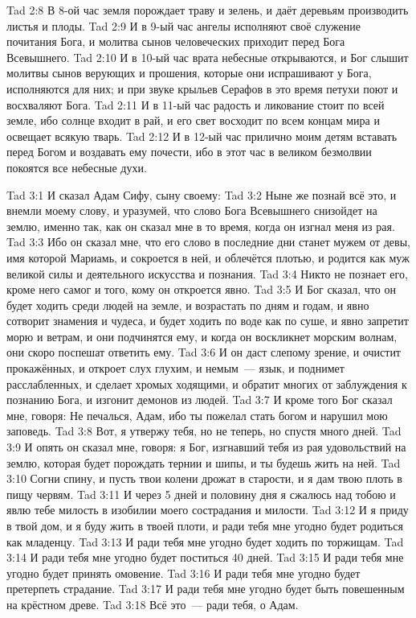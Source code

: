\vs Tad 2:8
В 8-ой час земля порождает траву и зелень,
и даёт деревьям производить листья и плоды.
\vs Tad 2:9
И в 9-ый час ангелы исполняют своё
служение почитания Бога,
и молитва сынов человеческих приходит перед Бога Всевышнего.
\vs Tad 2:10
И в 10-ый час врата небесные открываются,
и Бог слышит молитвы сынов верующих и прошения,
которые они испрашивают у Бога, исполняются для них;
и при звуке крыльев Серафов в это время
петухи поют и восхваляют Бога.
\vs Tad 2:11
И в 11-ый час радость и ликование стоит по всей земле,
ибо солнце входит в рай,
и его свет восходит по всем концам мира
и освещает всякую тварь.
\vs Tad 2:12
И в 12-ый час прилично моим детям вставать
перед Богом и воздавать ему почести,
ибо в этот час в великом безмолвии
покоятся все небесные духи.
 


\vs Tad 3:1
И сказал Адам Сифу, сыну своему:
\vs Tad 3:2
Ныне же познай всё это, и внемли моему слову,
и уразумей, что слово Бога Всевышнего снизойдет на землю,
именно так, как он сказал мне в то время,
когда он изгнал меня из рая.
\vs Tad 3:3
Ибо он сказал мне, что его слово в последние дни
станет мужем от девы, имя которой Мариамь,
и сокроется в ней, и облечётся плотью,
и родится как муж великой силы
и деятельного искусства и познания.
\vs Tad 3:4
Никто не познает его, кроме него самог и того,
кому он откроется явно.
\vs Tad 3:5
И Бог сказал, что он будет ходить среди людей на земле,
и возрастать по дням и годам,
и явно сотворит знамения и чудеса,
и будет ходить по воде как по суше,
и явно запретит морю и ветрам, и они подчинятся ему,
и когда он воскликнет морским волнам,
они скоро поспешат ответить ему.
\vs Tad 3:6
И он даст слепому зрение, и очистит прокажённых,
и откроет слух глухим, и немым~--- язык,
и поднимет расслабленных, и сделает хромых ходящими,
и обратит многих от заблуждения к познанию Бога,
и изгонит демонов из людей.
\vs Tad 3:7
И кроме того Бог сказал мне, говоря:
Не печалься, Адам, ибо ты пожелал стать богом
и нарушил мою заповедь.
\vs Tad 3:8
Вот, я утвержу тебя, но не теперь,
но спустя много дней.
\vs Tad 3:9
И опять он сказал мне, говоря:
я Бог, изгнавший тебя из рая удовольствий на землю,
которая будет порождать тернии и шипы,
и ты будешь жить на ней.
\vs Tad 3:10
Согни спину, и пусть твои колени дрожат в старости,
и я дам твою плоть в пищу червям.
\vs Tad 3:11
И через 5 дней и половину дня я сжалюсь над тобою
и явлю тебе милость в изобилии моего сострадания и милости.
\vs Tad 3:12
И я приду в твой дом, и я буду жить в твоей плоти,
и ради тебя мне угодно будет родиться как младенцу.
\vs Tad 3:13
И ради тебя мне угодно будет ходить по торжищам.
\vs Tad 3:14
И ради тебя мне угодно будет поститься 40 дней.
\vs Tad 3:15
И ради тебя мне угодно будет принять омовение.
\vs Tad 3:16
И ради тебя мне угодно будет претерпеть страдание.
\vs Tad 3:17
И ради тебя мне угодно будет быть повешенным на крёстном древе.
\vs Tad 3:18
Всё это~--- ради тебя, о Адам.

